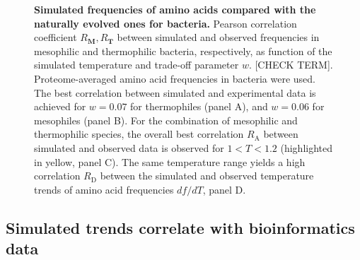 \documentclass[10pt,letterpaper]{article}
\begin{document}
\begin{figure}[h!]
\caption{
{\bf Simulated frequencies of amino acids compared with the naturally evolved ones for bacteria.} 
Pearson correlation coefficient $R_{\mathbf{M}}, R_{\mathbf{T}}$ between simulated and observed frequencies in mesophilic  and thermophilic bacteria, respectively, as function of the simulated temperature and trade-off parameter $w$. [CHECK TERM]. Proteome-averaged amino acid frequencies in bacteria were used. The best correlation between simulated and experimental data is achieved for $w=0.07$ for thermophiles (panel A), and $w=0.06$ for mesophiles (panel B). For the combination of mesophilic and thermophilic species, the overall best correlation $R_{\mathrm A}$ between simulated and observed data is observed for $1<T<1.2$ (highlighted in yellow, panel C). The same temperature range yields a high correlation $R_{\mathrm D}$ between the simulated and observed temperature trends of amino acid frequencies $df/dT$, panel D.
}
\label{fig:fig4}
\end{figure}


\subsection*{Simulated trends correlate with bioinformatics data}
\end{document}
